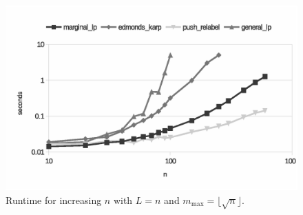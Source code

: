 \documentclass{article}
\begin{document}

\begin{figure}
	\caption{Runtime for increasing $n$ with  $L = n$ and 
	$m_{\text{max}} = \lfloor \sqrt{n} \rfloor$.}
	\label{fig:benchmark}
	\includegraphics[trim=0 20mm 0 0, clip, width=\linewidth]{combined}
\end{figure}

\end{document}
